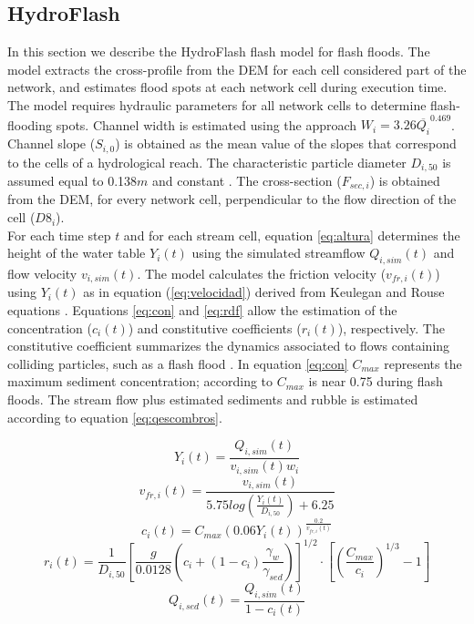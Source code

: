 \documentclass[hess, manuscript]{copernicus}
\begin{document}
\subsection{HydroFlash}

In this section we describe the HydroFlash flash model for flash floods. The model extracts the cross-profile from the DEM  for each cell considered part of the network,  and estimates flood spots at each network cell during execution time.\\

The model requires hydraulic parameters for all network cells to determine flash-flooding spots.  Channel width is estimated using the \cite{Leopold1953} approach $ W_i = 3.26 \overline{Q_i}^{0.469}$.  Channel slope ($S_{i,0}$) is obtained as the mean value of the slopes that correspond to the cells of a hydrological reach. The  characteristic particle diameter $D_{i,50}$ is assumed equal to 0.138$m$ and constant \citep{Golden2006}.  The cross-section ($F_{sec,i}$) is obtained from the DEM, for every network cell,  perpendicular to the flow direction of the cell ($D8_{i}$).\\

For each time step $t$ and for each stream cell, equation \ref{eq:altura} determines the height of the water table $Y_{i}(t)$ using the simulated streamflow $Q_{i,sim}(t)$ and flow velocity $v_{i,sim}(t)$. The model calculates the friction velocity ($v_{fr,i}(t)$) using $Y_i(t)$ as in equation (\ref{eq:velocidad}) derived from Keulegan and Rouse equations \citep{takahashi1991, Savage1984}. Equations \ref{eq:con} and \ref{eq:rdf} allow the estimation of the concentration ($c_{i}(t)$) and constitutive coefficients ($r_{i}(t)$), respectively. The constitutive coefficient summarizes the dynamics associated to flows containing colliding particles, such as a flash flood \citep{takahashi1991}.  In equation \ref{eq:con} $C_{max}$ represents the maximum sediment concentration;  according to \citet{Obrien1988} $C_{max}$ is near 0.75 during flash floods. The stream flow plus estimated sediments and rubble is estimated according to equation \ref{eq:qescombros}.

\begin{equation}
 Y_i(t) = \frac{Q_{i,sim}(t)}{v_{i,sim}(t) w_{i}}
 \label{eq:altura}
\end{equation}
\begin{equation}
 v_{fr,i}(t) = \frac{v_{i,sim}(t)}{5.75 log \left( \frac{Y_{i}(t)}{D_{i,50}} \right) + 6.25}
 \label{eq:velocidad}
\end{equation}
\begin{equation}
 c_{i}(t) = C_{max} (0.06 Y_{i}(t))^{\frac{0.2}{v_{fr,i}(t)}}
 \label{eq:con}
\end{equation}
\begin{equation}
r_{i}(t) = \frac{1}{D_{i,50}} \left [ \frac{g}{0.0128} \left( c_i+(1-c_i) \frac{\gamma_w}{\gamma_{sed}} \right ) \right ]^{1/2} \cdot \left[ \left( \frac{C_{max}}{c_i} \right )^{1/3} -1\right ]
 \label{eq:rdf}
\end{equation}
\begin{equation}
 Q_{i,sed}(t) = \frac{Q_{i,sim}(t)}{1-c_i(t)}
 \label{eq:qescombros}
\end{equation}
\end{document}

